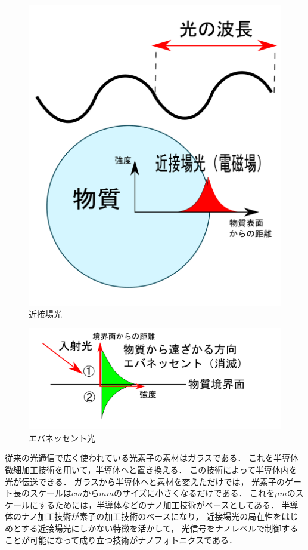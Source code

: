 \begin{figure}[t!]
\begin{center}
\includegraphics[keepaspectratio,scale=0.3]{fig/3/kinsetu.pdf}
\caption{近接場光}
\label{fig:kinsetu}
\end{center}
\end{figure}
\begin{figure}[t!]
\begin{center}
\includegraphics[keepaspectratio,scale=0.4]{fig/3/evanesent2.pdf}
\caption{エバネッセント光}
\label{fig:eva2}
\end{center}
\end{figure}
従来の光通信で広く使われている光素子の素材はガラスである．
これを半導体微細加工技術を用いて，半導体へと置き換える．
この技術によって半導体内を光が伝送できる．
ガラスから半導体へと素材を変えただけでは，
光素子のゲート長のスケールは$cmからmm$のサイズに小さくなるだけである．
これを$ \mu m$のスケールにするためには，半導体などのナノ加工技術がベースとしてある．
半導体のナノ加工技術が素子の加工技術のベースになり，
近接場光の局在性をはじめとする近接場光にしかない特徴を活かして，
光信号をナノレベルで制御することが可能になって成り立つ技術がナノフォトニクスである．

